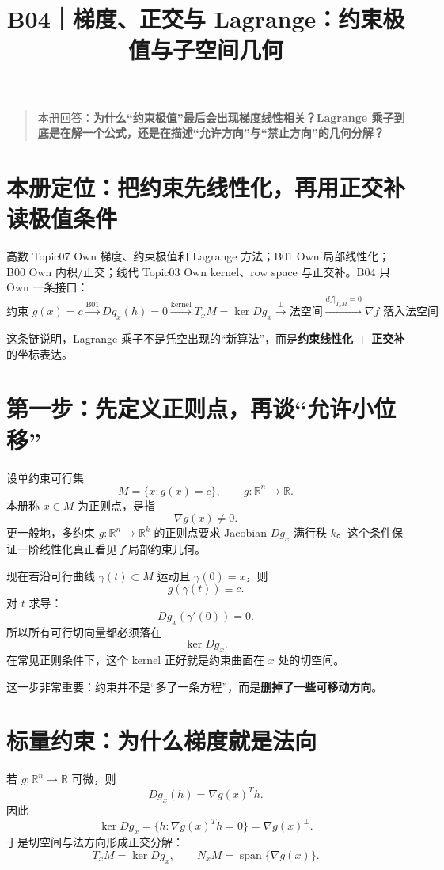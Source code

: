 \documentclass[profile=standard]{ipara-handbook}
\title{B04｜梯度、正交与 Lagrange：约束极值与子空间几何}
\author{}
\date{}
\begin{document}
\maketitle

\begin{quote}
本册回答：\textbf{为什么“约束极值”最后会出现梯度线性相关？Lagrange 乘子到底是在解一个公式，还是在描述“允许方向”与“禁止方向”的几何分解？}
\end{quote}

\section{本册定位：把约束先线性化，再用正交补读极值条件}
高数 Topic07 Own 梯度、约束极值和 Lagrange 方法；B01 Own 局部线性化；B00 Own 内积/正交；线代 Topic03 Own kernel、row space 与正交补。B04 只 Own 一条接口：
\[
\boxed{
\text{约束 }g(x)=c
\xrightarrow{\text{B01}}
Dg_x(h)=0
\xrightarrow{\text{kernel}}
T_xM=\ker Dg_x
\xrightarrow{\perp}
\text{法空间}
\xrightarrow{df|_{T_xM}=0}
\nabla f\text{ 落入法空间}
}
\]

这条链说明，Lagrange 乘子不是凭空出现的“新算法”，而是\textbf{约束线性化 + 正交补}的坐标表达。

\section{第一步：先定义正则点，再谈“允许小位移”}
设单约束可行集
\[
M=\{x:g(x)=c\},
\qquad g:\mathbb R^n\to\mathbb R.
\]
本册称 $x\in M$ 为正则点，是指
\[
\nabla g(x)\neq0.
\]
更一般地，多约束 $g:\mathbb R^n\to\mathbb R^k$ 的正则点要求 Jacobian $Dg_x$ 满行秩 $k$。这个条件保证一阶线性化真正看见了局部约束几何。

现在若沿可行曲线 $\gamma(t)\subset M$ 运动且 $\gamma(0)=x$，则
\[
g(\gamma(t))\equiv c.
\]
对 $t$ 求导：
\[
Dg_x(\gamma'(0))=0.
\]
所以所有可行切向量都必须落在
\[
\boxed{\ker Dg_x}.
\]
在常见正则条件下，这个 kernel 正好就是约束曲面在 $x$ 处的切空间。

这一步非常重要：约束并不是“多了一条方程”，而是\textbf{删掉了一些可移动方向}。

\section{标量约束：为什么梯度就是法向}
若 $g:\mathbb R^n\to\mathbb R$ 可微，则
\[
Dg_x(h)=\nabla g(x)^T h.
\]
因此
\[
\ker Dg_x=\{h:\nabla g(x)^Th=0\}=\nabla g(x)^\perp.
\]
于是切空间与法方向形成正交分解：
\[
T_xM=\ker Dg_x,
\qquad
N_xM=\operatorname{span}\{\nabla g(x)\}.
\]
\end{document}

